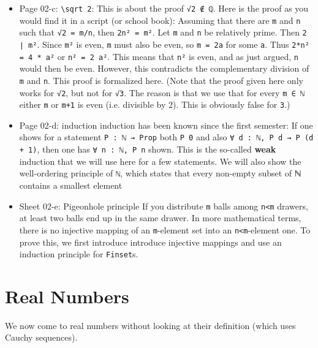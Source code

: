 \documentclass{memoir}
\begin{document}
\begin{itemize}
\item Page 02-c: \Verb|\sqrt 2|:
     This is about the proof \Verb|√2 ∉ ℚ|. Here is the proof as you would find it in a script (or school book): Assuming that there are \Verb|m| and \Verb|n| such that \Verb|√2 = m/n|, then  \Verb|2n² = m²|. Let \Verb|m| and \Verb|n| be relatively prime. Then \Verb|2 ∣ m²|. Since \Verb|m²| is even, \Verb|m| must also be even, so \Verb|m = 2a| for some \Verb|a|. Thus \Verb|2*n² = 4 * a²| or \Verb|n² = 2 a²|. This means that \Verb|n²| is even, and as just argued, \Verb|n| would then be even. However, this contradicts the complementary division of \Verb|m| and \Verb|n|. This proof is formalized here. (Note that the proof given here only works for \Verb|√2|, but not for \Verb|√3|. The reason is that we use that for every \Verb|m ∈ ℕ| either \Verb|m| or \Verb|m+1| is even (i.e. divisible by 2). This is obviously false for \Verb|3|.)\item Page 02-d: induction
    induction has been known since the first semester: If one shows for a statement \Verb|P : ℕ → Prop| both \Verb|P 0| and also \Verb|∀ d : ℕ, P d → P (d + 1)|, then one has \Verb|∀ n : ℕ, P n| shown. This is the so-called \textbf{weak}    induction that we will use here for a few statements. We will also show the well-ordering principle of \Verb|ℕ|, which states that every non-empty subset of ℕ contains a smallest element\item Sheet 02-e: Pigeonhole principle
   If you distribute \Verb|m| balls among \Verb|n<m| drawers, at least two balls end up in the same drawer. In more mathematical terms, there is no injective mapping of an \Verb|m|-element set into an \Verb|n<m|-element one. To prove this, we first introduce introduce injective mappings and use an induction principle for \Verb|Finset|s.
\end{itemize}




\section{Real Numbers}

We now come to real numbers without looking at their definition (which
uses Cauchy sequences).
\end{document}
